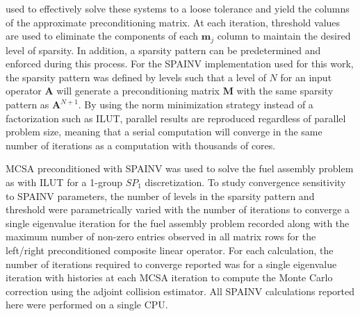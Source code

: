 used to effectively solve these systems to a loose tolerance and yield
the columns of the approximate preconditioning matrix. At each
iteration, threshold values are used to eliminate the components of
each $\mathbf{m}_j$ column to maintain the desired level of
sparsity. In addition, a sparsity pattern can be predetermined and
enforced during this process. For the SPAINV implementation used for
this work, the sparsity pattern was defined by levels such that a
level of $N$ for an input operator $\mathbf{A}$ will generate a
preconditioning matrix $\mathbf{M}$ with the same sparsity pattern as
$\mathbf{A}^{N+1}$. By using the norm minimization strategy instead of
a factorization such as ILUT, parallel results are reproduced
regardless of parallel problem size, meaning that a serial computation
will converge in the same number of iterations as a computation with
thousands of cores.

MCSA preconditioned with SPAINV was used to solve the fuel assembly
problem as with ILUT for a 1-group $SP_1$ discretization. To study
convergence sensitivity to SPAINV parameters, the number of levels in
the sparsity pattern and threshold were parametrically varied with the
number of iterations to converge a single eigenvalue iteration for the
fuel assembly problem recorded along with the maximum number of
non-zero entries observed in all matrix rows for the left/right
preconditioned composite linear operator. For each calculation, the
number of iterations required to converge reported was for a single
eigenvalue iteration with  histories at each MCSA iteration
to compute the Monte Carlo correction using the adjoint collision
estimator. All SPAINV calculations reported here were performed on a
single CPU.

